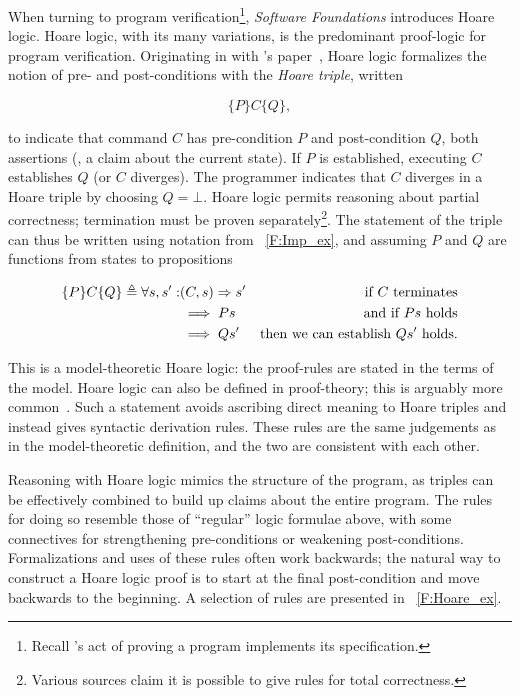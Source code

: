 When turning to program verification\footnote{Recall \citeauthor{EWD:EWD1036}'s
act of proving a program implements its specification.}, \emph{Software
Foundations} introduces Hoare logic. Hoare logic, with its many variations, is
the predominant proof-logic for program verification. Originating in
\citeyear{Hoare_1969} with \citeauthor{Hoare_1969}'s paper~\cite{Hoare_1969},
Hoare logic formalizes the notion of pre- and post-conditions with the
\emph{Hoare triple}, written

\begin{equation*}
    \{P\} C \{Q\},
\end{equation*}

to indicate that command \(C\) has pre-condition \(P\) and post-condition
\(Q\), both assertions (\eg, a claim about the current state). If \(P\) is
established, executing \(C\) establishes \(Q\) (or \(C\) diverges). The
programmer indicates that \(C\) diverges in a Hoare triple by choosing \(Q =
\bot\). Hoare logic permits reasoning about partial correctness; termination
must be proven separately\footnote{Various sources claim it is possible to give
rules for total correctness.}. The statement of the triple can thus be written
using notation from \figurename~\ref{F:Imp_ex}, and assuming \(P\) and \(Q\) are
functions from states to propositions

\begin{align*}
    \{P\} C \{Q\} \triangleq \forall s, s' : &(C, s) \mathrel{\Rightarrow} s' &\text{if \(C\) terminates} \\
    &\implies P s &\text{and if \(P s\) holds} \\
    &\implies Q s' &\text{then we can establish \(Q s'\) holds.}
\end{align*}

This is a model-theoretic Hoare logic: the proof-rules are stated in the terms
of the model. Hoare logic can also be defined in proof-theory; this is arguably
more common~\cite[Ch. \emph{Hoare Logic as a Logic}]{Pierce:SF2}. Such a
statement avoids ascribing direct meaning to Hoare triples and instead gives
syntactic derivation rules. These rules are the same judgements as in the
model-theoretic definition, and the two are consistent with each other.

Reasoning with Hoare logic mimics the structure of the program,
as triples can be effectively combined to build up claims about the entire
program. The rules for doing so resemble those of ``regular'' logic formulae
above, with some connectives for strengthening pre-conditions or weakening
post-conditions. Formalizations and uses of these rules often work backwards;
the natural way to construct a Hoare logic proof is to start at the final
post-condition and move backwards to the beginning. A selection of rules are
presented in \figurename~\ref{F:Hoare_ex}.

